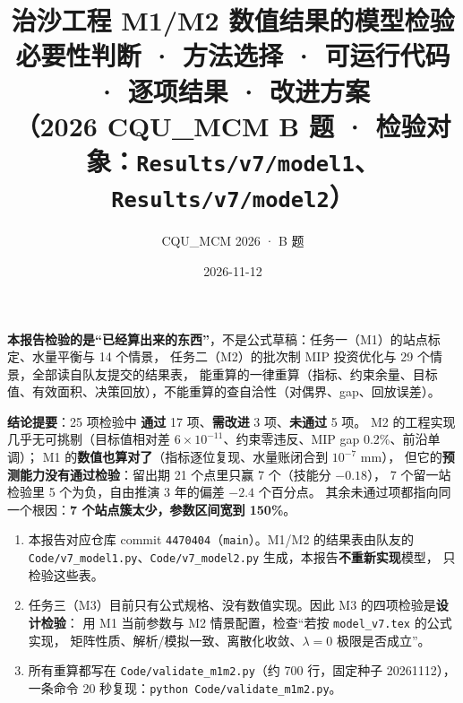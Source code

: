 \documentclass[11pt,a4paper]{ctexart}
\title{\bfseries 治沙工程 M1/M2 数值结果的模型检验\\[5pt]
\large 必要性判断 · 方法选择 · 可运行代码 · 逐项结果 · 改进方案\\[2pt]
\normalsize （2026 CQU\_MCM B 题 · 检验对象：\texttt{Results/v7/model1}、\texttt{Results/v7/model2}）}
\author{CQU\_MCM 2026 · B 题}
\date{2026-11-12}
\newcommand{\ok}{\textcolor{okc}{\textbf{通过}}}
\newcommand{\bad}{\textcolor{badc}{\textbf{未通过}}}
\newcommand{\warn}{\textcolor{warnc}{\textbf{需改进}}}
\begin{document}
\maketitle
\thispagestyle{empty}

\begin{center}
\begin{minipage}{0.90\textwidth}
\small
\textbf{本报告检验的是“已经算出来的东西”}，不是公式草稿：任务一（M1）的站点标定、水量平衡与 14 个情景，
任务二（M2）的批次制 MIP 投资优化与 29 个情景，全部读自队友提交的结果表，
能重算的一律重算（指标、约束余量、目标值、有效面积、决策回放），不能重算的查自洽性（对偶界、gap、回放误差）。

\vspace{3pt}
\textbf{结论提要}：25 项检验中 \ok{} 17 项、\warn{} 3 项、\bad{} 5 项。
M2 的工程实现几乎无可挑剔（目标值相对差 $6\times10^{-11}$、约束零违反、MIP gap 0.2\%、前沿单调）；
M1 的\textbf{数值也算对了}（指标逐位复现、水量账闭合到 $10^{-7}$ mm），
但它的\textbf{预测能力没有通过检验}：留出期 21 个点里只赢 7 个（技能分 $-0.18$），
7 个留一站检验里 5 个为负，自由推演 3 年的偏差 $-2.4$ 个百分点。
其余未通过项都指向同一个根因：\textbf{7 个站点簇太少，参数区间宽到 150\%}。
\end{minipage}
\end{center}

\vspace{0.4em}
\begin{keybox}
\begin{enumerate}
\item 本报告对应仓库 commit \texttt{4470404}（\texttt{main}）。M1/M2 的结果表由队友的
      \texttt{Code/v7\_model1.py}、\texttt{Code/v7\_model2.py} 生成，本报告\textbf{不重新实现}模型，
      只检验这些表。
\item 任务三（M3）目前只有公式规格、没有数值实现。因此 M3 的四项检验是\textbf{设计检验}：
      用 M1 当前参数与 M2 情景配置，检查“若按 \texttt{model\_v7.tex} 的公式实现，
      矩阵性质、解析/模拟一致、离散化收敛、$\lambda=0$ 极限是否成立”。
\item 所有重算都写在 \texttt{Code/validate\_m1m2.py}（约 700 行，固定种子 20261112），
      一条命令 20 秒复现：\texttt{python Code/validate\_m1m2.py}。
\end{enumerate}
\end{keybox}

\vspace{0.4em}
\tableofcontents
\newpage

\end{document}
